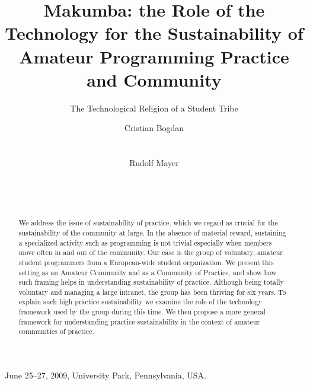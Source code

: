 \documentclass{sig-alt-release2}
\begin{document}
 {June 25--27, 2009, University Park, Pennsylvania, USA.} 



\title{Makumba: the Role of the Technology for the Sustainability of Amateur Programming Practice and Community}
\subtitle{The Technological Religion of a Student Tribe}

 \author{
 \alignauthor
 Cristian Bogdan\\
        \\
        \\
 \alignauthor
 Rudolf Mayer\\
        \\
        \\
        \\
 }


\maketitle
\begin{abstract}
We address the issue of sustainability of practice, which we regard as crucial for the sustainability of the community at large. In the absence of material reward, sustaining a specialized activity such as programming is not trivial especially when members move often in and out of the community. Our case is the group of voluntary, amateur student programmers from a European-wide student organization. We present this setting as an Amateur Community and as a Community of Practice, and show how such framing helps in understanding sustainability of practice. Although being totally voluntary and managing a large intranet, the group has been thriving for six years. To explain such high practice sustainability we examine the role of the technology framework used by the group during this time. We then propose a more general framework for understanding practice sustainability in the context of amateur communities of practice. 
\end{abstract}
\end{document}

